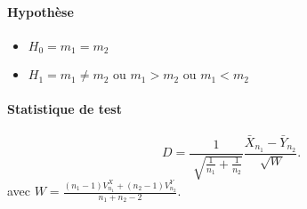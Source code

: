 \documentclass{article}
\theoremstyle{plain}%
\theoremstyle{definition}
\theoremstyle{remark}
\begin{document}
\paragraph*{Hypothèse}
\begin{itemize}
    \item $ H_0 = m_1 = m_2 $ 
    \item $ H_1 = m_1 \neq m_2 $ ou $ m_1 > m_2 $ ou $ m_1 < m_2 $ 
\end{itemize}

\paragraph*{Statistique de test}
\[
    D = \frac{1}{\sqrt[]{\frac{1}{n_1} + \frac{1}{n_2}}} \frac{\bar{X}_{n_1} - \bar{Y}_{n_2}}{\sqrt[]{W}}
.\]
avec $ W = \frac{(n_1 - 1) V_{n_1}^X + (n_2 - 1) V_{n_2}^Y}{n_1 + n_2 - 2} $. 
\end{document}
